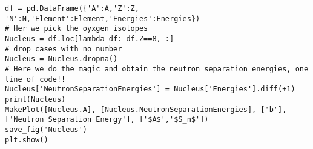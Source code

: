\documentclass[%
oneside,                 %
final,                   %
10pt]{article}
\newenvironment{doconceexercise}{}{}
\begin{document}
\begin{doconceexercise}
\begin{verbatim}
df = pd.DataFrame({'A':A,'Z':Z, 'N':N,'Element':Element,'Energies':Energies})
# Her we pick the oyxgen isotopes
Nucleus = df.loc[lambda df: df.Z==8, :]
# drop cases with no number
Nucleus = Nucleus.dropna()
# Here we do the magic and obtain the neutron separation energies, one line of code!!
Nucleus['NeutronSeparationEnergies'] = Nucleus['Energies'].diff(+1)
print(Nucleus)
MakePlot([Nucleus.A], [Nucleus.NeutronSeparationEnergies], ['b'], ['Neutron Separation Energy'], ['$A$','$S_n$'])
save_fig('Nucleus')
plt.show()

\end{verbatim}


\end{doconceexercise}


\end{document}
